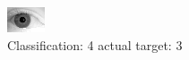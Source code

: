 \begin{figure}[h!]
\begin{center}
\includegraphics[width=0.60\columnwidth]{figures/ID2173_class_4_target_3.png}
\end{center}
\caption{ Classification: 4 actual target: 3}
\label{fig:ID2173_class_4_target_3}
\end{figure}
